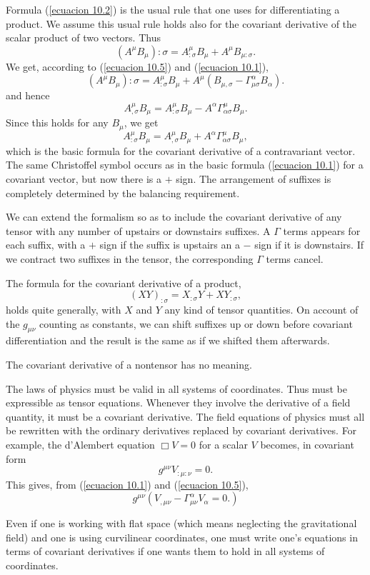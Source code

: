 Formula (\ref{ecuacion 10.2}) is the usual rule that one uses for 
differentiating a product. We assume this usual rule holds also for the 
covariant derivative of the scalar product of two vectors. Thus
\[
 \left( A^{\mu} B_{\mu}\right):{\sigma} =  
 A^{\mu}_{:\sigma}B_{\mu} +  A^{\mu} B_{\mu:\sigma}.
\]
We get, according to (\ref{ecuacion 10.5}) and (\ref{ecuacion 10.1}),
\[
 \left( A^{\mu} B_{\mu}\right){:\sigma} =  
 A^{\mu}_{:\sigma}B_{\mu} 
 + A^{\mu} \left( B_{\mu,\sigma} -\Gamma^{\alpha}_{\mu\sigma} B_{\alpha} 
\right).
\]
and hence 
\[
 A^{\mu}_{,\sigma} B_{\mu} = A^{\mu}_{:\sigma}B_{\mu} 
 - A^{\alpha}\Gamma^{\mu}_{\alpha\sigma} B_{\mu}.
\]
Since this holds for any $B_{\mu}$, we get
\begin{equation}
 \label{ecuacion 10.7}
   A^{\mu}_{:\sigma}B_{\mu} = A^{\mu}_{,\sigma} B_{\mu}  
 + A^{\alpha}\Gamma^{\mu}_{\alpha\sigma} B_{\mu},
\end{equation}
which is the basic formula for the covariant derivative of a contravariant 
vector. The same Christoffel symbol occurs as  in the basic formula 
(\ref{ecuacion 10.1}) for a covariant vector, but now there is a $+$ sign. The 
arrangement of suffixes is completely determined by the balancing requirement.

We can extend the formalism so as to include the covariant derivative of any 
tensor with any number of upstairs or downstairs suffixes. A $\Gamma$ terms 
appears for each suffix, with a $+$ sign if the suffix is upstairs an a $-$ 
sign if it is downstairs. If we contract two suffixes in the tensor, the 
corresponding $\Gamma$ terms cancel.

The formula for the covariant derivative of a product,
\begin{equation}
 \label{ecuacion 10.8}
 \left(X Y\right)_{:\sigma} = X_{:\sigma} Y + X Y_{:\sigma},
\end{equation}
holds quite generally, with $X$ and $Y$ any kind of tensor quantities. On 
account of the $g_{\mu\nu}$ counting as constants, we can shift suffixes up or 
down before covariant differentiation and the result is the same as if we 
shifted them afterwards.

The covariant derivative of a nontensor has no meaning.

The laws of physics must be valid in all systems of coordinates. Thus must be 
expressible as tensor equations. Whenever they involve the derivative of a 
field quantity, it must be a covariant derivative. The field equations of 
physics must all be rewritten with the ordinary derivatives replaced by 
covariant derivatives. For example, the d'Alembert equation $\Box V = 0$ for a 
scalar $V$ becomes, in covariant form
\[
 g^{\mu\nu} V_{:\mu:\nu} = 0.
\]
This gives, from (\ref{ecuacion 10.1}) and (\ref{ecuacion 10.5}),
\begin{equation}
 \label{ecuacion 10.9}
 g^{\mu\nu}\left( V_{,\mu\nu} - \Gamma^{\alpha}_{\mu\nu}V_{\alpha} = 0.\right)
\end{equation}

Even if one is working with flat space (which means neglecting the 
gravitational field) and one is using curvilinear coordinates, one must write 
one's equations in terms of covariant derivatives if one wants them to hold in 
all systems of coordinates.
